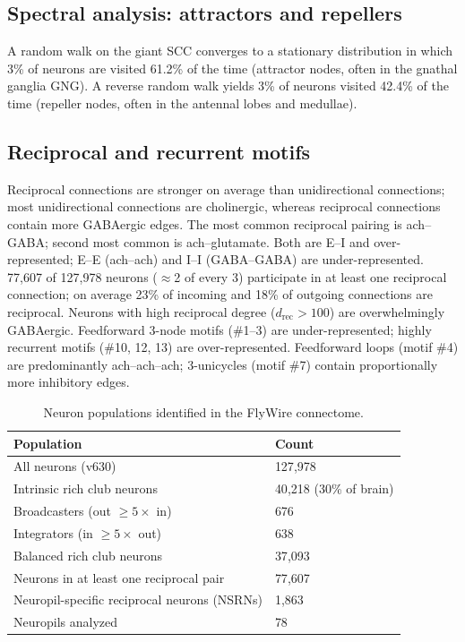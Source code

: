 \documentclass[11pt]{article}
\begin{document}
\subsection{Spectral analysis: attractors and repellers}
A random walk on the giant SCC converges to a stationary distribution in which 3\% of neurons are visited 61.2\% of the time (attractor nodes, often in the gnathal ganglia GNG). A reverse random walk yields 3\% of neurons visited 42.4\% of the time (repeller nodes, often in the antennal lobes and medullae).

\subsection{Reciprocal and recurrent motifs}
Reciprocal connections are stronger on average than unidirectional connections; most unidirectional connections are cholinergic, whereas reciprocal connections contain more GABAergic edges. The most common reciprocal pairing is ach--GABA; second most common is ach--glutamate. Both are E--I and over-represented; E--E (ach--ach) and I--I (GABA--GABA) are under-represented. 77{,}607 of 127{,}978 neurons ($\approx$2 of every 3) participate in at least one reciprocal connection; on average 23\% of incoming and 18\% of outgoing connections are reciprocal. Neurons with high reciprocal degree ($d_{\mathrm{rec}} > 100$) are overwhelmingly GABAergic. Feedforward 3-node motifs (\#1--3) are under-represented; highly recurrent motifs (\#10, 12, 13) are over-represented. Feedforward loops (motif \#4) are predominantly ach--ach--ach; 3-unicycles (motif \#7) contain proportionally more inhibitory edges.

\begin{table}[h]
\centering
\caption{Neuron populations identified in the FlyWire connectome.}
\begin{tabular}{ll}
\toprule
Population & Count \\
\midrule
All neurons (v630) & 127{,}978 \\
Intrinsic rich club neurons & 40{,}218 (30\% of brain) \\
Broadcasters (out $\geq 5\times$ in) & 676 \\
Integrators (in $\geq 5\times$ out) & 638 \\
Balanced rich club neurons & 37{,}093 \\
Neurons in at least one reciprocal pair & 77{,}607 \\
Neuropil-specific reciprocal neurons (NSRNs) & 1{,}863 \\
Neuropils analyzed & 78 \\
\bottomrule
\end{tabular}
\end{table}
\end{document}
